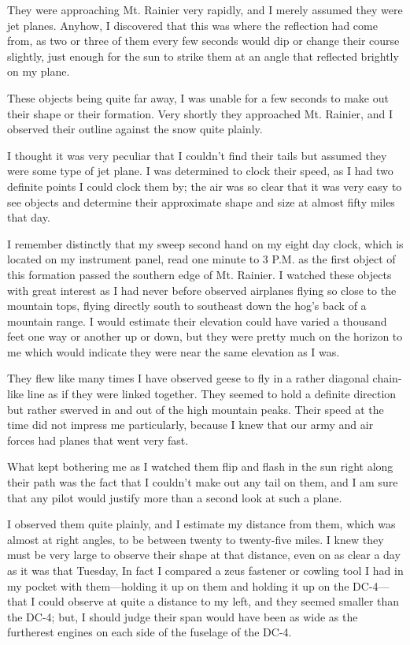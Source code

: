 \begin{svgraybox}
      They were approaching Mt. Rainier very rapidly, and I merely assumed they were jet planes. Anyhow, I discovered that this was where the reflection had come from, as two or three of them every few seconds would dip or change their course slightly, just enough for the sun to strike them at an angle that reflected brightly on my plane.

      These objects being quite far away, I was unable for a few seconds to make out their shape or their formation. Very shortly they approached Mt. Rainier, and I observed their outline against the snow quite plainly.

      I thought it was very peculiar that I couldn't find their tails but assumed they were some type of jet plane. I was determined to clock their speed, as I had two definite points I could clock them by; the air was so clear that it was very easy to see objects and determine their approximate shape and size at almost fifty miles that day.

      I remember distinctly that my sweep second hand on my eight day clock, which is located on my instrument panel,
read one minute to 3 P.M. as the first object of this formation passed the southern edge of Mt. Rainier.
I watched these objects with great interest as I had never before observed
airplanes flying so close to the mountain tops, flying directly south to southeast down the hog's back of a mountain range. I would estimate their elevation could have varied a thousand feet one way or another up or down, but they were pretty much on the horizon to me which would indicate they were near the same elevation as I was.

      They flew like many times I have observed geese to fly in a rather diagonal chain-like line as if they were linked together. They seemed to hold a definite direction but rather swerved in and out of the high mountain peaks. Their speed at the time did not impress me particularly, because I knew that our army and air forces had planes that went very fast.

      What kept bothering me as I watched them flip and flash in the sun right along their path was the fact that I couldn't make out any tail on them, and I am sure that any pilot would justify more than a second look at such a plane.

      I observed them quite plainly, and I estimate my distance from them, which was almost at right angles, to be between twenty to twenty-five miles. I knew they must be very large to observe their shape at that distance, even on as clear a day as it was that Tuesday, In fact I compared a zeus fastener or cowling tool I had in my pocket with them---holding it up on them and holding it up on the DC-4---that I could observe at quite a distance to my left, and they seemed smaller than the DC-4; but, I should judge their span would have been as wide as the furtherest engines on each side of the fuselage of the DC-4.


\end{svgraybox}
